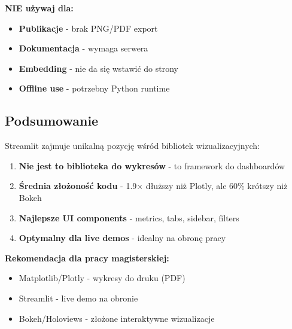 \documentclass[a4paper,11pt]{article}
\begin{document}
\textbf{NIE używaj dla:}
\begin{itemize}
    \item \textbf{Publikacje} - brak PNG/PDF export
    \item \textbf{Dokumentacja} - wymaga serwera
    \item \textbf{Embedding} - nie da się wstawić do strony
    \item \textbf{Offline use} - potrzebny Python runtime
\end{itemize}

\subsection{Podsumowanie}

Streamlit zajmuje unikalną pozycję wśród bibliotek wizualizacyjnych:

\begin{enumerate}
    \item \textbf{Nie jest to biblioteka do wykresów} - to framework do dashboardów
    \item \textbf{Średnia złożoność kodu} - 1.9× dłuższy niż Plotly, ale 60\% krótszy niż Bokeh
    \item \textbf{Najlepsze UI components} - metrics, tabs, sidebar, filters
    \item \textbf{Optymalny dla live demos} - idealny na obronę pracy
\end{enumerate}

\textbf{Rekomendacja dla pracy magisterskiej:}

\begin{itemize}
    \item Matplotlib/Plotly - wykresy do druku (PDF)
    \item Streamlit - live demo na obronie
    \item Bokeh/Holoviews - złożone interaktywne wizualizacje
\end{itemize}
\end{document}
